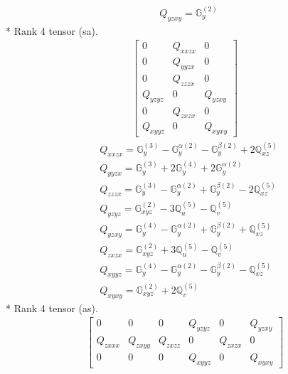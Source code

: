 \documentclass[fleqn,8pt,landscape]{jsarticle}
\begin{document}
\begin{align*}
& Q_{yzxy} = \mathbb{G}_{y}^{(2)}
\end{align*}
* Rank 4 tensor (sa).
\begin{align*}
\begin{bmatrix} 0 & Q_{xxzx} & 0 \\ 0 & Q_{yyzx} & 0 \\ 0 & Q_{zzzx} & 0 \\ Q_{yzyz} & 0 & Q_{yzxy} \\ 0 & Q_{zxzx} & 0 \\ Q_{xyyz} & 0 & Q_{xyxy} \end{bmatrix}
\end{align*}
\begin{align*}
& Q_{xxzx} = \mathbb{G}_{y}^{(3)} - \mathbb{G}_{y}^{\alpha(2)} - \mathbb{G}_{y}^{\beta(2)} + 2 \mathbb{Q}_{xz}^{(5)} \\
& Q_{yyzx} = \mathbb{G}_{y}^{(3)} + 2 \mathbb{G}_{y}^{(4)} + 2 \mathbb{G}_{y}^{\alpha(2)} \\
& Q_{zzzx} = \mathbb{G}_{y}^{(3)} - \mathbb{G}_{y}^{\alpha(2)} + \mathbb{G}_{y}^{\beta(2)} - 2 \mathbb{Q}_{xz}^{(5)} \\
& Q_{yzyz} = \mathbb{G}_{xyz}^{(2)} - 3 \mathbb{Q}_{u}^{(5)} - \mathbb{Q}_{v}^{(5)} \\
& Q_{yzxy} = \mathbb{G}_{y}^{(4)} - \mathbb{G}_{y}^{\alpha(2)} + \mathbb{G}_{y}^{\beta(2)} + \mathbb{Q}_{xz}^{(5)} \\
& Q_{zxzx} = \mathbb{G}_{xyz}^{(2)} + 3 \mathbb{Q}_{u}^{(5)} - \mathbb{Q}_{v}^{(5)} \\
& Q_{xyyz} = \mathbb{G}_{y}^{(4)} - \mathbb{G}_{y}^{\alpha(2)} - \mathbb{G}_{y}^{\beta(2)} - \mathbb{Q}_{xz}^{(5)} \\
& Q_{xyxy} = \mathbb{G}_{xyz}^{(2)} + 2 \mathbb{Q}_{v}^{(5)}
\end{align*}
* Rank 4 tensor (as).
\begin{align*}
\begin{bmatrix} 0 & 0 & 0 & Q_{yzyz} & 0 & Q_{yzxy} \\ Q_{zxxx} & Q_{zxyy} & Q_{zxzz} & 0 & Q_{zxzx} & 0 \\ 0 & 0 & 0 & Q_{xyyz} & 0 & Q_{xyxy} \end{bmatrix}
\end{align*}
\end{document}

